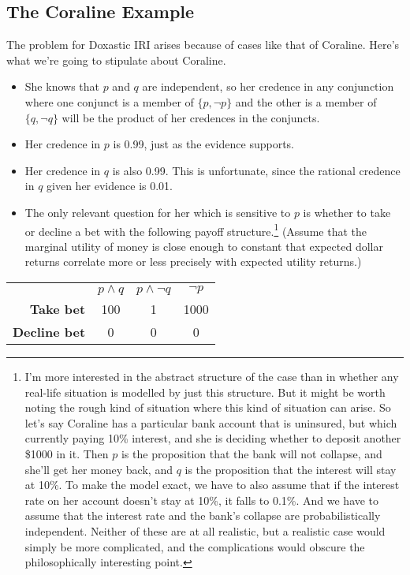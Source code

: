 \subsection{The Coraline Example}
The problem for Doxastic IRI arises because of cases like that of Coraline. Here's what we're going to stipulate about Coraline.

\begin{itemize}
\item She knows that $p$ and $q$ are independent, so her credence in any conjunction where one conjunct is a member of  $\{p,  \neg p\}$ and the other is a member of $\{q, \neg q\}$ will be the product of her credences in the conjuncts.
\item Her credence in $p$ is 0.99, just as the evidence supports.
\item Her credence in $q$ is also 0.99. This is unfortunate, since the rational credence in $q$ given her evidence is 0.01.
\item The only relevant question for her which is sensitive to $p$ is whether to take or decline a bet with the following payoff structure.\footnote{I'm more interested in the abstract structure of the case than in whether any real-life situation is modelled by just this structure. But it might be worth noting the rough kind of situation where this kind of situation can arise. So let's say Coraline has a particular bank account that is uninsured, but which currently paying 10\% interest, and she is deciding whether to deposit another \$1000 in it. Then $p$ is the proposition that the bank will not collapse, and she'll get her money back, and $q$ is the proposition that the interest will stay at 10\%. To make the model exact, we have to also assume that if the interest rate on her account doesn't stay at 10\%, it falls to 0.1\%. And we have to assume that the interest rate and the bank's collapse are probabilistically independent. Neither of these are at all realistic, but a realistic case would simply be more complicated, and the complications would obscure the philosophically interesting point.} (Assume that the marginal utility of money is close enough to constant that expected dollar returns correlate more or less precisely with expected utility returns.)
\end{itemize}

\begin{center}
\begin{tabular}{r c c c}
 & \textbf{$p \wedge q$} & \textbf{$p \wedge \neg q$} & \textbf{$\neg p$} \\
\textbf{Take bet} & 100 & 1 & 1000\\
\textbf{Decline bet} & 0 & 0 & 0 \\
\end{tabular}
\end{center}

